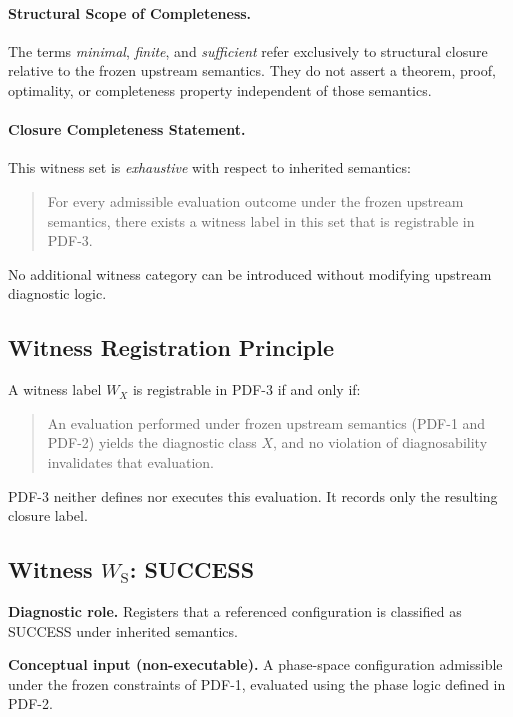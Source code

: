 \paragraph{Structural Scope of Completeness.}
The terms \emph{minimal}, \emph{finite}, and \emph{sufficient} refer exclusively
to structural closure relative to the frozen upstream semantics.
They do not assert a theorem, proof, optimality, or completeness property
independent of those semantics.

\paragraph{Closure Completeness Statement.}
This witness set is \emph{exhaustive} with respect to inherited semantics:

\begin{quote}
For every admissible evaluation outcome under the frozen upstream semantics,
there exists a witness label in this set that is registrable in PDF-3.
\end{quote}

No additional witness category can be introduced
without modifying upstream diagnostic logic.

\subsection{Witness Registration Principle}

A witness label $W_X$ is registrable in PDF-3 if and only if:

\begin{quote}
An evaluation performed under frozen upstream semantics
(PDF-1 and PDF-2) yields the diagnostic class $X$,
and no violation of diagnosability invalidates that evaluation.
\end{quote}

PDF-3 neither defines nor executes this evaluation.
It records only the resulting closure label.

\subsection{\texorpdfstring{Witness $W_{\mathrm{S}}$: SUCCESS}{Witness WS: SUCCESS}}

\textbf{Diagnostic role.}
Registers that a referenced configuration is classified as SUCCESS
under inherited semantics.

\textbf{Conceptual input (non-executable).}
A phase-space configuration admissible under the frozen constraints of PDF-1,
evaluated using the phase logic defined in PDF-2.

